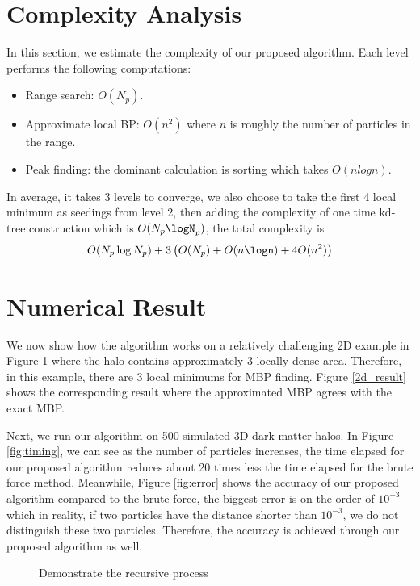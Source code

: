 \section{Complexity Analysis}
In this section, we estimate the complexity of our proposed algorithm. Each level performs the following computations:
\begin{itemize}
  \item Range search: $O(N_p)$. 
  \item Approximate local BP: $O(n^2)$ where $n$ is roughly the number of particles in the range.
  \item Peak finding: the dominant calculation is sorting which takes $O(nlogn)$. 
\end{itemize}
In average, it takes 3 levels to converge, we also choose to take the first 4 local minimum as seedings from level 2, then adding the complexity of one time kd-tree construction which is $O(N_p \logN_p)$, the total complexity is
\[\displaystyle O(N_p \log N_p)+3\left(O(N_p)+O(n\logn)+4O(n^2)\right)\] 
\section{Numerical Result}

We now show how the algorithm works on a relatively challenging 2D example in Figure \ref{illu_level} where the halo contains approximately 3 locally dense area. Therefore, in this example, there are 3 local minimums for MBP finding. Figure \ref{2d_result} shows the corresponding result where the approximated MBP agrees with the exact MBP.

Next, we run our algorithm on 500 simulated 3D dark matter halos. In Figure \ref{fig:timing}, we can see as the number of particles increases, the time elapsed for our proposed algorithm reduces about 20 times less the time elapsed for the brute force method. Meanwhile, Figure \ref{fig:error} shows the accuracy of our proposed algorithm compared to the brute force, the biggest error is on the order of $10^{-3}$ which in reality, if two particles have the distance shorter than $10^{-3}$, we do not distinguish these two particles. Therefore, the accuracy is achieved through our proposed algorithm as well.  

\begin{figure}[h]
\subfloat[ \label{fig:1st}]{
\texttt{[image: 2d\_1]}}
\hfill
\subfloat[ \label{fig:2nd}]{
\texttt{[image: 2d\_2]}}
\caption{Demonstrate the recursive process}
\label{illu_level}
\end{figure}

